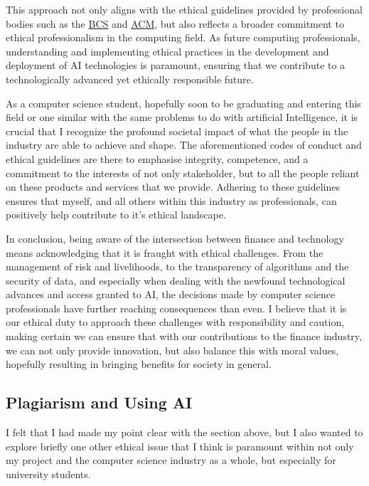 \documentclass{article}
\begin{document}
This approach not only aligns with the ethical guidelines provided by professional bodies such as the \href{https://www.bcs.org/media/2211/bcs-code-of-conduct.pdf}{BCS} and \href{https://www.acm.org/code-of-ethics}{ACM}, but also reflects a broader commitment to ethical professionalism in the computing field. As future computing professionals, understanding and implementing ethical practices in the development and deployment of AI technologies is paramount, ensuring that we contribute to a technologically advanced yet ethically responsible future.\\\vspace{0.3cm}

As a computer science student, hopefully soon to be graduating and entering this field or one similar with the same problems to do with artificial Intelligence, it is crucial that I recognize the profound societal impact of what the people in the industry are able to achieve and shape. The aforementioned codes of conduct and ethical guidelines are there to emphasise integrity, competence, and a commitment to the interests of not only stakeholder, but to all the people reliant on these products and services that we provide. Adhering to these guidelines ensures that myself, and all others within this industry as professionals, can positively help contribute to it's ethical landscape.\\\vspace{0.3cm}

In conclusion, being aware of the intersection between finance and technology means acknowledging that it is fraught with ethical challenges. From the management of risk and livelihoods, to the transparency of algorithms and the security of data, and especially when dealing with the newfound technological advances and access granted to AI, the decisions made by computer science professionals have further reaching consequences than even. I believe that it is our ethical duty to approach these challenges with responsibility and caution, making certain we can ensure that with our contributions to the finance industry, we can not only provide innovation, but also balance this with moral values, hopefully resulting in bringing benefits for society in general.


\subsection{Plagiarism and Using AI}
I felt that I had made my point clear with the section above, but I also wanted to explore briefly one other ethical issue that I think is paramount within not only my project and the computer science industry as a whole, but especially for university students.\\\vspace{0.3cm}
\end{document}
